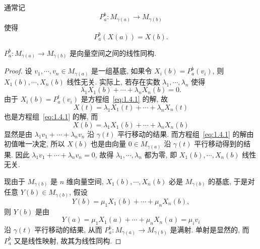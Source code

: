 通常记
\[P_a^b\colon M_{\gamma(a)}\longrightarrow M_{\gamma(b)}\]
使得
\[P_a^b(X(a)) = X(b).\]


\begin{theorem}
  $P_a^b\colon M_{\gamma(a)}\longrightarrow M_{\gamma(b)}$
  是向量空间之间的线性同构.
\end{theorem}

\begin{proof}
  设 $v_1,\cdots,v_n\in M_{\gamma(a)}$ 是一组基底, 如果令 $X_i(b)=P_a^b(v_i)$, 则
  $X_1(b),\cdots, X_n(b)$ 线性无关. 实际上, 若存在实数 $\lambda_1,\cdots,\lambda_n$ 使得
  \[\lambda_1 X_1(b)+\cdots+\lambda_n X_n(b)=0.\]
  由于 $X_i(b)=P_a^t(v_i)$ 是方程组~\eqref{eq:1.4.1} 的解, 故
  \[X(t) = \lambda_1 X_1(t)+\cdots+\lambda_n X_n(t)\]
  也是方程组~\eqref{eq:1.4.1} 的解, 而
  \[X(b) = \lambda_1 X_1(b)+\cdots+\lambda_n X_n(b)\]
  显然是由 $\lambda_1 v_1+\cdots+\lambda_n v_n$ 沿 $\gamma(t)$ 平行移动的结果.
  而方程组~\eqref{eq:1.4.1} 的解由初值唯一决定, 所以 $X(b)$
  也是由向量 $0\in M_{\gamma(a)}$ 沿 $\gamma(t)$ 平行移动得到的结果.
  因此 $\lambda_1 v_1+\cdots+\lambda_n v_n=0$,
  故得 $\lambda_1,\cdots,\lambda_n$ 都为零, 即
  $X_1(b),\cdots,X_n(b)$ 线性无关.

  现由于 $M_{\gamma(b)}$ 是 $n$ 维向量空间, $X_1(b),\cdots,X_n(b)$
  必是 $M_{\gamma(b)}$ 的基底, 于是对任意 $Y(b)\in M_{\gamma(b)}$, 假设
  \[Y(b) = \mu_1 X_1(b)+\cdots+\mu_n X_n(b),\]
  则 $Y(b)$ 是由
  \[Y(a) = \mu_1 X_1(a)+\cdots+\mu_n X_n(a) = \mu_i v_i\]
  沿 $\gamma(t)$ 平行移动的结果, 从而 $P_a^b\colon M_{\gamma(a)}\to M_{\gamma(b)}$
  是满射. 单射是显然的, 而 $P_a^b$ 又是线性映射, 故其为线性同构.
\end{proof}



